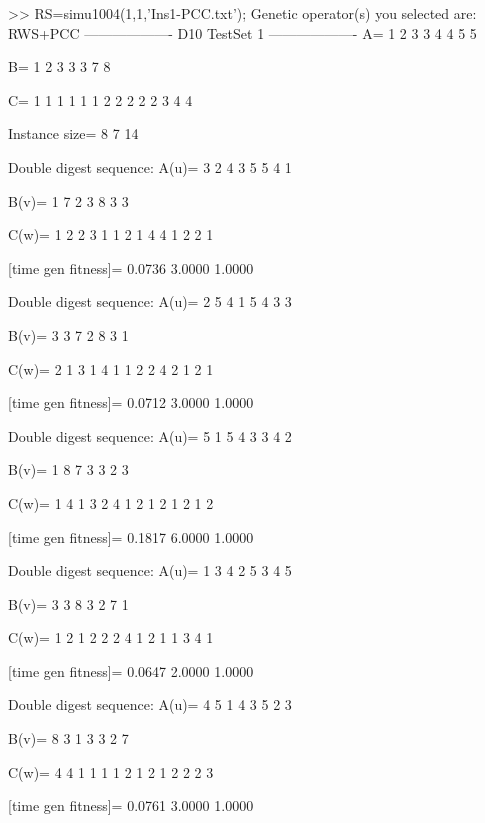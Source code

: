 >> RS=simu1004(1,1,'Ins1-PCC.txt');
Genetic operator(s) you selected are:
RWS+PCC
------------------- D10 TestSet 1 -------------------
A=
     1     2     3     3     4     4     5     5

B=
     1     2     3     3     3     7     8

C=
     1     1     1     1     1     1     2     2     2     2     2     3     4     4

Instance size=
     8     7    14

Double digest sequence:
A(u)=
     3     2     4     3     5     5     4     1

B(v)=
     1     7     2     3     8     3     3

C(w)=
     1     2     2     3     1     1     2     1     4     4     1     2     2     1

[time gen fitness]=
    0.0736    3.0000    1.0000

Double digest sequence:
A(u)=
     2     5     4     1     5     4     3     3

B(v)=
     3     3     7     2     8     3     1

C(w)=
     2     1     3     1     4     1     1     2     2     4     2     1     2     1

[time gen fitness]=
    0.0712    3.0000    1.0000

Double digest sequence:
A(u)=
     5     1     5     4     3     3     4     2

B(v)=
     1     8     7     3     3     2     3

C(w)=
     1     4     1     3     2     4     1     2     1     2     1     2     1     2

[time gen fitness]=
    0.1817    6.0000    1.0000

Double digest sequence:
A(u)=
     1     3     4     2     5     3     4     5

B(v)=
     3     3     8     3     2     7     1

C(w)=
     1     2     1     2     2     2     4     1     2     1     1     3     4     1

[time gen fitness]=
    0.0647    2.0000    1.0000

Double digest sequence:
A(u)=
     4     5     1     4     3     5     2     3

B(v)=
     8     3     1     3     3     2     7

C(w)=
     4     4     1     1     1     1     2     1     2     1     2     2     2     3

[time gen fitness]=
    0.0761    3.0000    1.0000

